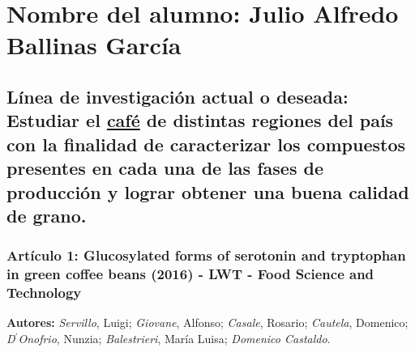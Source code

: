 \documentclass{article}
\begin{document}
\tableofcontents \newpage

\begin{center}
\end{center}  \vspace{2cm}


\section{Nombre del alumno: Julio Alfredo Ballinas García} \vspace{0.5cm}

\subsection{\textcolor{Apple Green}{\textbf{Línea de investigación actual o deseada}}: Estudiar el \textcolor{Mahogany}{\textbf{\underline{café}}} de distintas regiones del país con la finalidad de caracterizar los compuestos presentes en cada una de las fases de producción y lograr obtener una buena calidad de grano.} \vspace{0.5cm}

\subsubsection{\textbf{Artículo 1:} \textcolor{Cinnabar}{\textbf{Glucosylated forms of serotonin and tryptophan in green coffee beans (2016) -  LWT - Food Science and Technology}}}  \vspace{0.5cm}

\textbf{Autores:} \textit{Servillo}, Luigi; \textit{Giovane}, Alfonso; \textit{Casale}, Rosario; \textit{Cautela}, Domenico; \textit{D$^{\prime}$Onofrio}, Nunzia; \textit{Balestrieri}, María Luisa; \textit{Domenico Castaldo}. \vspace{0.5cm}
\end{document}

